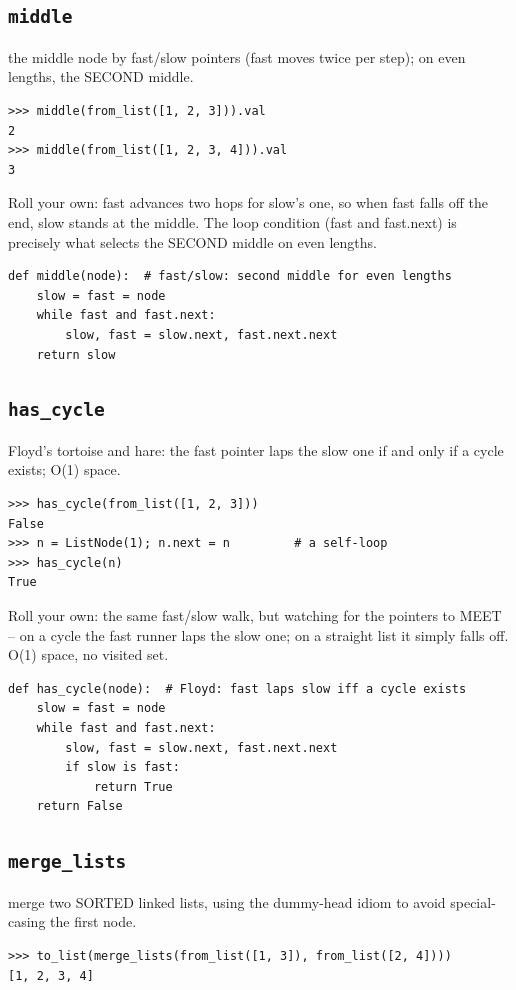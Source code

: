 \documentclass[10pt,letterpaper]{book}
\begin{document}
\subsection{\texttt{middle}}\label{def:middle}
the middle node by fast/slow pointers (fast moves twice per step); on even lengths, the SECOND middle.
\begin{lstlisting}[style=ex]
>>> middle(from_list([1, 2, 3])).val
2
>>> middle(from_list([1, 2, 3, 4])).val
3
\end{lstlisting}

Roll your own: fast advances two hops for slow's one, so when fast falls off the end, slow stands at the middle. The loop condition (fast and fast.next) is precisely what selects the SECOND middle on even lengths.

\begin{lstlisting}[style=ex]
def middle(node):  # fast/slow: second middle for even lengths
    slow = fast = node
    while fast and fast.next:
        slow, fast = slow.next, fast.next.next
    return slow
\end{lstlisting}
\subsection{\texttt{has\_cycle}}\label{def:has-cycle}
Floyd's tortoise and hare: the fast pointer laps the slow one if and only if a cycle exists; O(1) space.
\begin{lstlisting}[style=ex]
>>> has_cycle(from_list([1, 2, 3]))
False
>>> n = ListNode(1); n.next = n         # a self-loop
>>> has_cycle(n)
True
\end{lstlisting}

Roll your own: the same fast/slow walk, but watching for the pointers to MEET -- on a cycle the fast runner laps the slow one; on a straight list it simply falls off. O(1) space, no visited set.

\begin{lstlisting}[style=ex]
def has_cycle(node):  # Floyd: fast laps slow iff a cycle exists
    slow = fast = node
    while fast and fast.next:
        slow, fast = slow.next, fast.next.next
        if slow is fast:
            return True
    return False
\end{lstlisting}
\subsection{\texttt{merge\_lists}}\label{def:merge-lists}
merge two SORTED linked lists, using the dummy-head idiom to avoid special-casing the first node.
\begin{lstlisting}[style=ex]
>>> to_list(merge_lists(from_list([1, 3]), from_list([2, 4])))
[1, 2, 3, 4]
\end{lstlisting}
\end{document}
